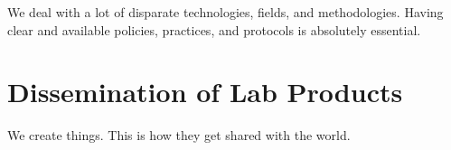 \documentclass[
]{book}
\begin{document}
We deal with a lot of disparate technologies, fields, and methodologies. Having clear and available policies, practices, and protocols is absolutely essential.

\hypertarget{diss}{%
\chapter{Dissemination of Lab Products}\label{diss}}

We create things. This is how they get shared with the world.

  
\end{document}
